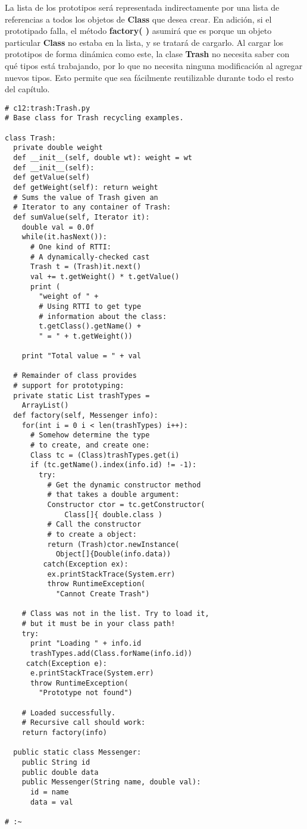 La lista de los prototipos será representada indirectamente por una lista de referencias a todos los objetos de \textbf{Class} que desea crear. En adición, si el prototipado falla, el método \textbf{factory( )} asumirá que es porque un objeto particular \textbf{Class} no estaba en la lista, y se tratará de cargarlo. Al cargar los prototipos de forma dinámica como este, la clase \textbf{Trash} no necesita saber con qué tipos está trabajando, por lo que no necesita ninguna modificación al agregar nuevos tipos. Esto permite que sea fácilmente reutilizable durante todo el resto del capítulo.     \newline

\begin{lstlisting} 
# c12:trash:Trash.py 
# Base class for Trash recycling examples. 

class Trash: 
  private double weight 
  def __init__(self, double wt): weight = wt  
  def __init__(self): 
  def getValue(self) 
  def getWeight(self): return weight  
  # Sums the value of Trash given an 
  # Iterator to any container of Trash: 
  def sumValue(self, Iterator it): 
    double val = 0.0f 
    while(it.hasNext()): 
      # One kind of RTTI: 
      # A dynamically-checked cast 
      Trash t = (Trash)it.next() 
      val += t.getWeight() * t.getValue() 
      print ( 
        "weight of " + 
        # Using RTTI to get type 
        # information about the class: 
        t.getClass().getName() + 
        " = " + t.getWeight()) 
        
    print "Total value = " + val 
    
  # Remainder of class provides  
  # support for prototyping: 
  private static List trashTypes =  
    ArrayList() 
  def factory(self, Messenger info): 
    for(int i = 0 i < len(trashTypes) i++): 
      # Somehow determine the type 
      # to create, and create one: 
      Class tc = (Class)trashTypes.get(i) 
      if (tc.getName().index(info.id) != -1): 
        try: 
          # Get the dynamic constructor method 
          # that takes a double argument: 
          Constructor ctor = tc.getConstructor( 
              Class[]{ double.class ) 
          # Call the constructor   
          # to create a object: 
          return (Trash)ctor.newInstance( 
            Object[]{Double(info.data)) 
         catch(Exception ex): 
          ex.printStackTrace(System.err) 
          throw RuntimeException( 
            "Cannot Create Trash") 
            
    # Class was not in the list. Try to load it, 
    # but it must be in your class path! 
    try: 
      print "Loading " + info.id 
      trashTypes.add(Class.forName(info.id)) 
     catch(Exception e): 
      e.printStackTrace(System.err) 
      throw RuntimeException( 
        "Prototype not found") 
        
    # Loaded successfully.  
    # Recursive call should work: 
    return factory(info) 
    
  public static class Messenger: 
    public String id 
    public double data 
    public Messenger(String name, double val): 
      id = name 
      data = val 
      
# :~ 
\end{lstlisting}

